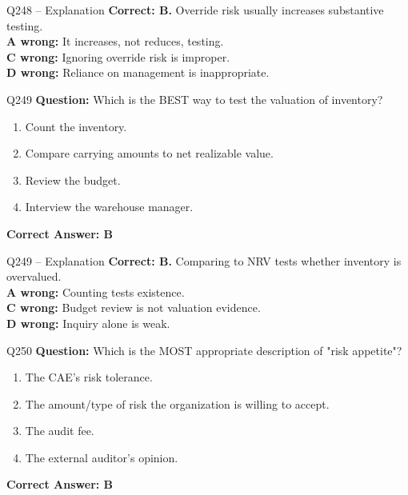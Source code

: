 \documentclass[aspectratio=169,10pt]{beamer}
\begin{document}
	\begin{frame}[t]{Q248 -- Explanation}
		\small
		\textbf{Correct: B.} Override risk usually increases substantive testing. \\[4pt]
		\textbf{A wrong:} It increases, not reduces, testing. \\[2pt]
		\textbf{C wrong:} Ignoring override risk is improper. \\[2pt]
		\textbf{D wrong:} Reliance on management is inappropriate.
	\end{frame}
	
	\begin{frame}[t]{Q249}
		\small
		\textbf{Question:} Which is the BEST way to test the valuation of inventory?
		\begin{enumerate}[label=\Alph*.,itemsep=1pt,topsep=2pt]
			\item Count the inventory.
			\item Compare carrying amounts to net realizable value.
			\item Review the budget.
			\item Interview the warehouse manager.
		\end{enumerate}
		\vspace{4pt}
		\textbf{Correct Answer: B}
	\end{frame}
	
	\begin{frame}[t]{Q249 -- Explanation}
		\small
		\textbf{Correct: B.} Comparing to NRV tests whether inventory is overvalued. \\[4pt]
		\textbf{A wrong:} Counting tests existence. \\[2pt]
		\textbf{C wrong:} Budget review is not valuation evidence. \\[2pt]
		\textbf{D wrong:} Inquiry alone is weak.
	\end{frame}
	
	\begin{frame}[t]{Q250}
		\small
		\textbf{Question:} Which is the MOST appropriate description of "risk appetite"?
		\begin{enumerate}[label=\Alph*.,itemsep=1pt,topsep=2pt]
			\item The CAE's risk tolerance.
			\item The amount/type of risk the organization is willing to accept.
			\item The audit fee.
			\item The external auditor's opinion.
		\end{enumerate}
		\vspace{4pt}
		\textbf{Correct Answer: B}
	\end{frame}
	
\end{document}
